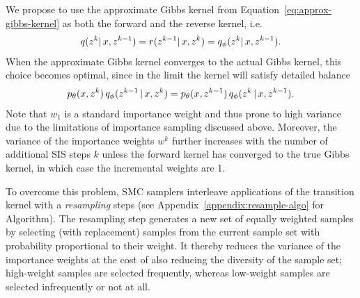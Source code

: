 \documentclass{article}
\theoremstyle{definition}
\begin{document}
We propose to use the approximate Gibbs kernel from Equation~\ref{eq:approx-gibbs-kernel} as both the forward and the reverse kernel, i.e.
\begin{align}
    q(z^{k} |\, x, z^{k-1}) = r(z^{k-1} |\, x, z^k) = q_\phi(z^k |\, x, z^{k-1}).
\end{align}
When the approximate Gibbs kernel converges to the actual Gibbs kernel, this choice becomes optimal, since in the limit the kernel will satisfy detailed balance 
\begin{align*}
    p_\theta(x, z^k) 
    \,
    q_\phi(z^{k-1} \,|\, x, z^{k})
    =
    p_\theta(x, z^{k-1}) 
    \,
    q_\phi(z^{k} \,|\, x, z^{k-1}).
\end{align*}
Note that $w_1$ is a standard importance weight and thus prone to high variance due to the limitations of importance sampling discussed above. Moreover, the variance of the importance weights $w^k$ further increases with the number of additional SIS steps $k$ unless the forward kernel has converged to the true Gibbs kernel, in which case the incremental weights are 1.

To overcome this problem, SMC samplers interleave applications of the transition kernel with a \emph{resampling} steps (see Appendix~\ref{appendix:resample-algo} for Algorithm). The resampling step generates a new set of equally weighted samples by selecting (with replacement) samples from the current sample set with probability proportional to their weight.
It thereby reduces the variance of the importance weights at the cost of also reducing the diversity of the sample set; high-weight samples are selected frequently, whereas low-weight samples are selected infrequently or not at all.
\end{document}
